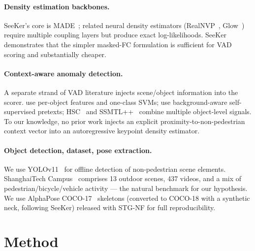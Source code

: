 \documentclass{article}
\begin{document}
\paragraph{Density estimation backbones.}
SeeKer's core is MADE~\citep{germain2015made}; related neural density
estimators (RealNVP~\citep{dinh2017realnvp}, Glow~\citep{kingma2018glow})
require multiple coupling layers but produce exact log-likelihoods.
SeeKer demonstrates that the simpler masked-FC formulation is sufficient
for VAD scoring and substantially cheaper.

\paragraph{Context-aware anomaly detection.}
A separate strand of VAD literature injects scene/object information into
the scorer. \citet{ionescu2019object} use per-object features and one-class
SVMs; \citet{georgescu2021background} use background-aware self-supervised
pretexts; HSC~\citep{sun2023hierarchical} and
SSMTL++~\citep{georgescu2022ssmtl} combine multiple object-level signals.
To our knowledge, no prior work injects an explicit
proximity-to-non-pedestrian context vector into an autoregressive keypoint
density estimator.

\paragraph{Object detection, dataset, pose extraction.}
We use YOLOv11~\citep{ultralytics2024yolov11} for offline detection of
non-pedestrian scene elements. ShanghaiTech
Campus~\citep{liu2018future} comprises 13 outdoor scenes, 437 videos, and a
mix of pedestrian/bicycle/vehicle activity --- the natural benchmark for
our hypothesis. We use AlphaPose COCO-17~\citep{fang2017rmpe} skeletons
(converted to COCO-18 with a synthetic neck, following SeeKer) released
with STG-NF for full reproducibility.

\section{Method}
\label{sec:method}
\end{document}
